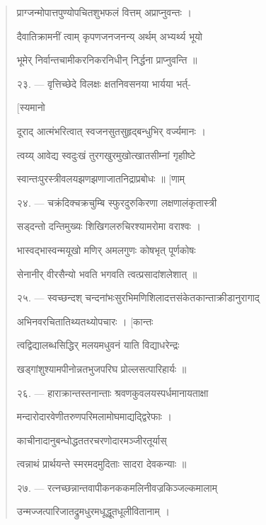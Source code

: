\documentclass[a4paper, 11pt, oneside, french, landscape, twocolumn]{article}
\begin{document}
\begin{quotation}
\texthindi{प्राग्जन्मोपात्तपुण्योपचितशुभफलं वित्तम् अप्राप्नुवन्तः ।}

\texthindi{दैवातिक्रामनीं त्वाम् कृपणजनजनन्य् अर्थम् अभ्यर्थ्य भूयो}

\texthindi{भूमेर् निर्वान्तचामीकरनिकरनिधीन् निर्द्धना प्राप्नुवन्ति ॥}

\bigskip

\texthindi{२३}. --- \texthindi{वृत्तिच्छेदे विलक्षः क्षतनिवसनया भार्यया भर्त्-}

\hspace*{55mm}\texthindi{[स्यमानो}

\texthindi{दूराद् आत्मंभरित्वात् स्वजनसुतसुहृद्बन्धुभिर् वर्ज्यमानः ।}

\texthindi{त्वय्य् आवेद्य स्वदुःखं तुरगखुरमुखोत्खातसीम्नां गृहाीष्टे}

\texthindi{स्वान्तःपुरस्त्रीवलयझणझणाजातनिद्राप्रबोधः ॥ [णाम्}

\bigskip

\texthindi{२४}. --- \texthindi{चक्रंदिक्चक्रचुम्बि स्फुरदुरुकिरणा लक्षणालंकृतास्त्री}

\texthindi{सड्दन्तो दन्तिमुख्यः शिखिगलरुचिरश्यामरोमा वराश्वः ।}

\texthindi{भास्वद्भास्वन्मयूखो मणिर् अमलगुणः कोषभृत् पूर्णकोषः}

\texthindi{सेनानीर् वीरसैन्यो भवति भगवति त्वत्प्रसादांशलेशात् ॥}

\bigskip

\texthindi{२५}. --- \texthindi{स्वच्छन्दश् चन्दनांभःसुरभिमणिशिलादत्तसंकेतकान्ताक्रीडानुरागाद्}

\texthindi{अभिनवरचितातिथ्यतथ्योपचारः । [कान्तः}

\texthindi{त्वद्विद्यालब्धसिद्धिर् मलयमधुवनं याति विद्याधरेन्द्रः}

\texthindi{खड्गांशुश्यामपीनोन्नतभुजपरिघ प्रोल्लसत्पारिहार्यः ॥}

\bigskip

\texthindi{२६}. --- \texthindi{हाराक्रान्तस्तनान्ताः श्रवणकुवलयस्पर्धमानायताक्षा}

\texthindi{मन्दारोदारवेणीतरुणपरिमलामोघमाद्यद्द्विरेफाः ।}

\texthindi{काचीनादानुबन्धोद्धततरचरणोदारमञ्जीरतूर्यास्}

\texthindi{त्वन्नाथं प्रार्थयन्ते स्मरमदमुदिताः सादरा देवकन्याः ॥}

\bigskip

\texthindi{२७}. --- \texthindi{रत्नच्छन्नान्तवापीकनककमलिनीवज्रकिञ्जल्कमालाम्}

\texthindi{उन्मज्जत्पारिजातद्रुमधुरमधूद्धूतधूलीवितानाम् ।}


\end{quotation}
\end{document}
